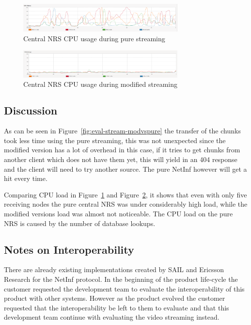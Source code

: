 \begin{figure}[h!]
	\centering
		\includegraphics[width=0.75\textwidth]{./img/eval-stream-pure-cpu.png}
    	\caption{Central NRS CPU usage during pure streaming}
	\label{fig:eval-stream-pure-cpu}
\end{figure}

\begin{figure}[h!]
	\centering
		\includegraphics[width=0.75\textwidth]{./img/eval-stream-mod-cpu.png}
    	\caption{Central NRS CPU usage during modified streaming}
	\label{fig:eval-stream-mod-cpu}
\end{figure}

\subsection{Discussion}
As can be seen in Figure~\ref{fig:eval-stream-modvspure} the transfer of the chunks 
took less time using the pure streaming, this was not unexpected since the modified version has a lot of overhead in this case, 
if it tries to get chunks from another client which does not have them yet, 
this will yield in an 404 response and the client will need to try another source. 
The pure NetInf however will get a hit every time. 

Comparing CPU load in Figure~\ref{fig:eval-stream-pure-cpu} and Figure~\ref{fig:eval-stream-mod-cpu}, 
it shows that even with only five receiving nodes the pure central NRS was under considerably high load,
while the modified versions load was almost not noticeable. The CPU load on the pure NRS is caused by  
the number of database lookups. 

\subsection{Notes on Interoperability}

There are already existing implementations created by SAIL and Ericsson Research 
for the NetInf protocol. In the beginning of the product 
life-cycle the customer requested the development team to evaluate the interoperability 
of this product with other systems. However as the product evolved the customer requested 
that the interoperability be left to them to evaluate and that this development team 
continue with evaluating the video streaming instead.

